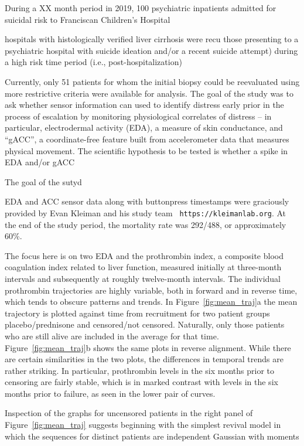 \documentclass[12pt]{amsart}
\begin{document}
During a XX month period in 2019, 100 psychiatric inpatients admitted
for suicidal risk to Franciscan Children's Hospital 


hospitals with histologically verified liver cirrhosis were recu
those presenting to a psychiatric hospital with suicide ideation
and/or a recent suicide attempt) during a high risk time period (i.e.,
post-hospitalization)

Currently, only 51 patients for whom the initial biopsy could be
reevaluated using more restrictive criteria were available for
analysis.
The goal of the study was to ask whether sensor information can used
to identify distress early prior in the process of escalation by
monitoring physiological correlates of distress -- in particular,
electrodermal activity (EDA), a measure of skin conductance, and
``gACC'', a coordinate-free feature built from accelerometer data 
that measures physical movement. 
The scientific hypothesis to be tested is whether a spike in
EDA and/or gACC 

The goal of the sutyd



EDA and ACC sensor data along with buttonpress timestamps were
graciously provided by Evan Kleiman and his study team {\tt
https://kleimanlab.org}.
At the end of the study period, the mortality rate was 292/488, or
approximately 60\%.

The focus here is on two EDA and the  prothrombin index, a composite
blood coagulation index
related to liver function, measured initially at three-month intervals
and subsequently at roughly twelve-month intervals.
The individual prothrombin trajectories are highly variable,
both in forward and in reverse time,
which tends to obscure patterns and trends.
In Figure~\ref{fig:mean_traj}a the mean trajectory is plotted against time from recruitment
for two patient groups placebo/prednisone and censored/not censored.
Naturally, only those patients who are still alive are included in the average
for that time.
Figure~\ref{fig:mean_traj}b shows the same plots in reverse alignment.
While there are certain similarities in the two plots,
the differences in temporal trends are rather striking.
In particular, prothrombin levels in the six months prior to censoring are fairly stable,
which is in marked contrast with levels in the six months prior to failure,
as seen in the lower pair of curves.

Inspection of the graphs for uncensored patients in the right panel of Figure~\ref{fig:mean_traj} suggests
beginning with the simplest revival model in which the sequences
for distinct patients are independent Gaussian with moments
\end{document}
